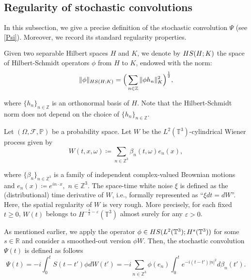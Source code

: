 \documentclass[letterpaper, 11pt,  reqno]{amsart}
\newcommand{\1}{\hspace{0.5mm}\text{I}\hspace{0.5mm}}
\newcommand{\noi}{\noindent}
\newcommand{\Z}{\mathbb{Z}}
\newcommand{\R}{\mathbb{R}}
\newcommand{\T}{\mathbb{T}}
\newcommand{\eps}{\varepsilon}
\newcommand{\HS}{\textup{HS}}
\newcommand{\N}{\mathbb{N}}
\numberwithin{equation}{section}
\numberwithin{theorem}{section}
\begin{document}
\subsection{Regularity of stochastic convolutions}\label{Sec:s-conv}
In this subsection,
we give a precise definition of the stochastic convolution $\Psi$ (see \eqref{Psi}).
Moreover, we record its standard regularity properties.

Given two separable Hilbert spaces $H$ and $K$, 
we denote by $\HS(H; K)$ the space of Hilbert-Schmidt operators
$\phi$ from $H$ to $K$, endowed with the norm:
\begin{equation*}
    \|\phi\|_{\HS(H;K)}
    = \Big(\sum_{n\in\mathbb{Z}}\|\phi h_n\|_K^2 \Big)^{\frac{1}{2}},
\end{equation*}



\noi
where $\{h_n\}_{n \in \Z}$ is an orthonormal basis of $H$.
Note that the Hilbert-Schmidt norm does not depend on the choice of $\{h_n\}_{n\in \Z}$.



Let $(\Omega,\mathcal{F},\mathbb{P})$ be a probability space.
Let $W$ be the $L^2(\T^3)$-cylindrical Wiener process given by
\begin{equation*}
    W(t,x,\omega)
    \coloneqq
    \sum_{n\in\mathbb{Z}^3}
    \beta_n(t,\omega)e_n(x),
\end{equation*}



\noi
where $\{\beta_n\}_{n\in\mathbb{Z}^3}$ is a family of independent complex-valued Brownian motions
and $e_n(x)\coloneqq e^{i n\cdot x},$ $n\in\mathbb{Z}^3$. 
The space-time white noise $\xi$ is defined as the (distributional) time derivative of $W$, i.e., formally represented as ``$\xi dt=d W$''.
Here, the spatial regularity of $W$ is very rough.
More precisely, for each fixed $t\geq 0$, $W(t)$ belongs to $H^{-\frac{3}{2}-\eps}(\T^3)$ almost surely for any $\eps > 0$.

As mentioned earlier, we apply the operator $\phi \in \HS(L^2(\T^3); H^s(\T^3))$ for some $s \in \R$ and consider a smoothed-out version $\phi W$.
Then,
the stochastic convolution
$\Psi(t)$ is defined as follows
\begin{equation}\label{Psi'}
    \Psi(t)
    =-i\int_0^t S(t-t')\phi dW(t')
    = -i \sum_{n\in\mathbb{Z}^3}
   \phi( e_n)
    \int_0^t e^{-i(t-t')|n|^2} d\beta_n(t').
\end{equation}
\end{document}
